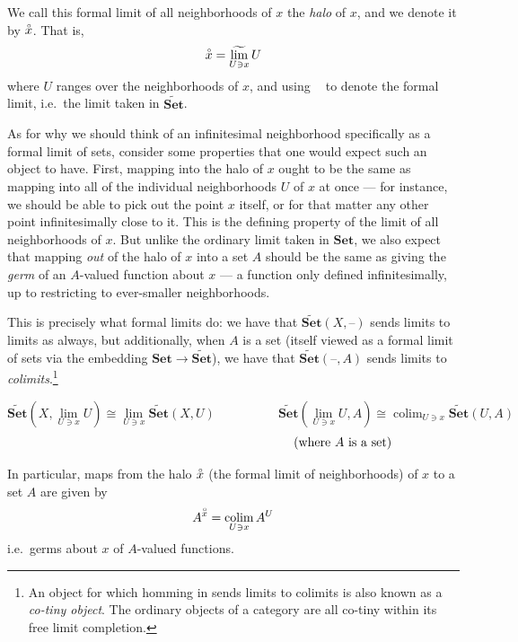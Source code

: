 \documentclass[11pt, oneside, article]{memoir}
\theoremstyle{plain}
\theoremstyle{definition}
\theoremstyle{remark}
\DeclareMathOperator*{\colim}{colim}
\newcommand{\flim}{\mathop{\widetilde{\mathrm{lim}}}}
\newcommand{\dash}{{\mathord{\text{--}}}}
\newcommand{\namedcat}[1]{\mathbf{#1}}
\newcommand{\Set}{\namedcat{Set}}
\newcommand{\halo}[1]{\accentset{\circ}{#1}}
\newcommand{\Ho}[1]{#1}
\newcommand{\xA}{A}
\newcommand{\xU}{U}
\newcommand{\xX}{X}
\begin{document}
We call this formal limit of all neighborhoods of $x$ the \emph{halo}
of $x$, and we denote it by $\halo{x}$. That is,
\[\halo{x} = \flim_{U \ni x} U\]
where $U$ ranges over the neighborhoods of $x$, and using $\flim$ to denote the
formal limit, i.e.\ the limit taken in $\widetilde{\Set}$.

As for why we should think of an infinitesimal neighborhood
specifically as a formal limit of sets, consider some properties that
one would expect such an object to have. First, mapping into the halo
of $x$ ought to be the same as mapping into all of the individual
neighborhoods $\xU$ of $x$ at once --- for instance, we should be able
to pick out the point $x$ itself, or for that matter any other point
infinitesimally close to it. This is the defining property of the
limit of all neighborhoods of $x$. But unlike the ordinary limit taken
in $\Set$, we also expect that mapping \emph{out} of the halo of $x$
into a set $\xA$ should be the same as giving the \emph{germ} of an
$\xA$-valued function about $x$ --- a function only defined
infinitesimally, up to restricting to ever-smaller neighborhoods.

This is precisely what formal limits do: we have that
$\Ho{\widetilde{\Set}}(\xX, \dash)$ sends limits to limits as always,
but additionally, when $\xA$ is a set (itself viewed as a formal limit
of sets via the embedding $\Set \to \widetilde{\Set}$), we have that
$\Ho{\widetilde{\Set}}(\dash, \xA)$ sends limits to
\emph{colimits}.\footnote{An object for which homming in sends limits
  to colimits is also known as a \emph{co-tiny object}. The ordinary
  objects of a category are all co-tiny within its free limit
  completion.}

\[
  \Ho{\widetilde{\Set}}(\xX, \lim_{\xU \ni x} \xU) \cong \lim_{\xU \ni x} \Ho{\widetilde{\Set}}(\xX, \xU) \qquad\quad\qquad \Ho{\widetilde{\Set}}(\lim_{\xU \ni x} \xU, \xA) \cong \colim_{\xU \ni x} \Ho{\widetilde{\Set}}(\xU, \xA)
\]
\nopagebreak
\vspace{-1.5em}
\[
  \hspace{17.5em}\text{(where $\xA$ is a set)}
\]

In particular, maps from the halo $\halo{x}$ (the formal limit of
neighborhoods) of $x$ to a set $\xA$ are given by
\[\xA^{\halo{x}} = \colim_{U \ni x} \xA^\xU\]
i.e.\ germs about $x$ of $\xA$-valued functions.
\end{document}
